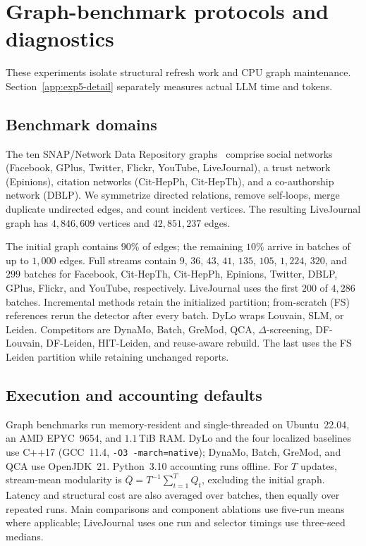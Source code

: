 \section{Graph-benchmark protocols and diagnostics}\label{app:benchmarks}

These experiments isolate structural refresh work and CPU graph maintenance.
Section~\ref{app:exp5-detail} separately measures actual LLM time and tokens.

\subsection{Benchmark domains}\label{app:dataset-details}

The ten SNAP/Network Data Repository graphs~\cite{snapnets,nr} comprise
social networks (Facebook, GPlus, Twitter, Flickr, YouTube, LiveJournal),
a trust network (Epinions), citation networks (Cit-HepPh, Cit-HepTh), and
a co-authorship network (DBLP). We symmetrize directed relations, remove
self-loops, merge duplicate undirected edges, and count incident vertices.
The resulting LiveJournal graph has $4{,}846{,}609$ vertices and
$42{,}851{,}237$ edges.

The initial graph contains $90\%$ of edges; the remaining $10\%$ arrive
in batches of up to $1{,}000$ edges. Full streams contain $9$, $36$, $43$,
$41$, $135$, $105$, $1{,}224$, $320$, and $299$ batches for Facebook,
Cit-HepTh, Cit-HepPh, Epinions, Twitter, DBLP, GPlus, Flickr, and YouTube,
respectively. LiveJournal uses the first $200$ of $4{,}286$ batches.
Incremental methods retain the initialized partition; from-scratch (FS)
references rerun the detector after every batch. DyLo wraps Louvain, SLM,
or Leiden. Competitors are DynaMo, Batch, GreMod, QCA, $\Delta$-screening,
DF-Louvain, DF-Leiden, HIT-Leiden, and reuse-aware rebuild. The last uses
the FS Leiden partition while retaining unchanged reports.

\subsection{Execution and accounting defaults}\label{app:exp-defaults}

Graph benchmarks run memory-resident and single-threaded on Ubuntu~22.04,
an AMD EPYC~9654, and $1.1$\,TiB RAM. DyLo and the four localized baselines
use C++17 (GCC~11.4, \texttt{-O3 -march=native}); DynaMo, Batch, GreMod,
and QCA use OpenJDK~21. Python~3.10 accounting runs offline.
For $T$ updates, stream-mean modularity is
$\bar Q=T^{-1}\sum_{t=1}^{T}Q_t$, excluding the initial graph.
Latency and structural cost are also averaged over batches, then equally
over repeated runs. Main comparisons and component ablations use five-run
means where applicable; LiveJournal uses one run and selector timings use
three-seed medians.

